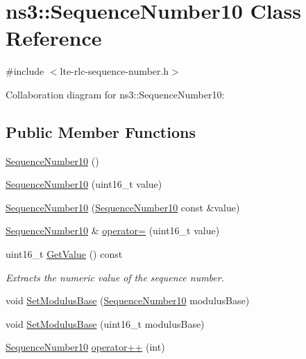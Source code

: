 \hypertarget{classns3_1_1SequenceNumber10}{}\section{ns3\+:\+:Sequence\+Number10 Class Reference}
\label{classns3_1_1SequenceNumber10}


{\ttfamily \#include $<$lte-\/rlc-\/sequence-\/number.\+h$>$}



Collaboration diagram for ns3\+:\+:Sequence\+Number10\+:
\subsection*{Public Member Functions}
\begin{DoxyCompactItemize}
\item 
\hyperlink{classns3_1_1SequenceNumber10_a53ed04b0e43bf51655fe43dcbfa8ecb8}{Sequence\+Number10} ()
\item 
\hyperlink{classns3_1_1SequenceNumber10_a9fe077fd1e052d30e6abad5380e504ee}{Sequence\+Number10} (uint16\+\_\+t value)
\item 
\hyperlink{classns3_1_1SequenceNumber10_a3e68cdc6f917cbf7383f9468a01ce8d0}{Sequence\+Number10} (\hyperlink{classns3_1_1SequenceNumber10}{Sequence\+Number10} const \&value)
\item 
\hyperlink{classns3_1_1SequenceNumber10}{Sequence\+Number10} \& \hyperlink{classns3_1_1SequenceNumber10_acdf4af59d2d0da34e15f0f310c967be5}{operator=} (uint16\+\_\+t value)
\item 
uint16\+\_\+t \hyperlink{classns3_1_1SequenceNumber10_a9dcaea04bc415e169e7e0020ce579d01}{Get\+Value} () const 
\begin{DoxyCompactList}\small\item\em Extracts the numeric value of the sequence number. \end{DoxyCompactList}\item 
void \hyperlink{classns3_1_1SequenceNumber10_afd6d1e35503ecdab3a9b4b3e8c77e47c}{Set\+Modulus\+Base} (\hyperlink{classns3_1_1SequenceNumber10}{Sequence\+Number10} modulus\+Base)
\item 
void \hyperlink{classns3_1_1SequenceNumber10_a487d85091e0c35311d72edb673ffb6ad}{Set\+Modulus\+Base} (uint16\+\_\+t modulus\+Base)
\item 
\hyperlink{classns3_1_1SequenceNumber10}{Sequence\+Number10} \hyperlink{classns3_1_1SequenceNumber10_acf32d5af08928d1aef107e66bd1e6be6}{operator++} (int)

\end{DoxyCompactItemize}
